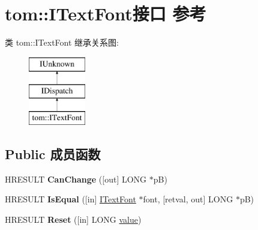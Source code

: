 \hypertarget{interfacetom_1_1_i_text_font}{}\section{tom\+:\+:I\+Text\+Font接口 参考}
\label{interfacetom_1_1_i_text_font}
类 tom\+:\+:I\+Text\+Font 继承关系图\+:\begin{figure}[H]
\begin{center}
\leavevmode
\includegraphics[height=3.000000cm]{interfacetom_1_1_i_text_font}
\end{center}
\end{figure}
\subsection*{Public 成员函数}
\begin{DoxyCompactItemize}
\item 
\mbox{\label{interfacetom_1_1_i_text_font_ad8f4b0fef70e62de0d83a64f7e4d12b6}} 
H\+R\+E\+S\+U\+LT {\bfseries Can\+Change} (\mbox{[}out\mbox{]} L\+O\+NG $\ast$pB)
\item 
\mbox{\label{interfacetom_1_1_i_text_font_ad7a21e3897ac7e5f028a1b0f26c6e420}} 
H\+R\+E\+S\+U\+LT {\bfseries Is\+Equal} (\mbox{[}in\mbox{]} \hyperlink{interfacetom_1_1_i_text_font}{I\+Text\+Font} $\ast$font, \mbox{[}retval, out\mbox{]} L\+O\+NG $\ast$pB)
\item 
\mbox{\label{interfacetom_1_1_i_text_font_adec7ee29382cd868043ec0a96936b36c}} 
H\+R\+E\+S\+U\+LT {\bfseries Reset} (\mbox{[}in\mbox{]} L\+O\+NG \hyperlink{unionvalue}{value})
\end{DoxyCompactItemize}
